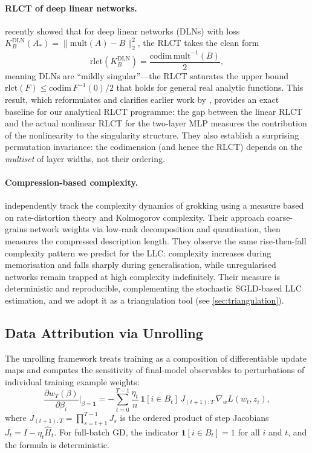 \documentclass[11pt,a4paper]{article}
\begin{document}
\paragraph{RLCT of deep linear networks.} \citet{pepinlehalleur2025geometry} recently showed that for deep linear networks (DLNs) with loss $K^{\mathrm{DLN}}_B(A_*) = \|\mathrm{mult}(A) - B\|_2^2$, the RLCT takes the clean form
\begin{equation}
    \mathrm{rlct}(K^{\mathrm{DLN}}_B) = \frac{\mathrm{codim}\,\mathrm{mult}^{-1}(B)}{2},
\end{equation}
meaning DLNs are ``mildly singular''---the RLCT saturates the upper bound $\mathrm{rlct}(F) \leq \mathrm{codim}\,F^{-1}(0)/2$ that holds for general real analytic functions. This result, which reformulates and clarifies earlier work by \citet{aoyagi2024consideration}, provides an exact baseline for our analytical RLCT programme: the gap between the linear RLCT and the actual nonlinear RLCT for the two-layer MLP measures the contribution of the nonlinearity to the singularity structure. They also establish a surprising permutation invariance: the codimension (and hence the RLCT) depends on the \emph{multiset} of layer widths, not their ordering.

\paragraph{Compression-based complexity.} \citet{demoss2025complexity} independently track the complexity dynamics of grokking using a measure based on rate-distortion theory and Kolmogorov complexity. Their approach coarse-grains network weights via low-rank decomposition and quantisation, then measures the compressed description length. They observe the same rise-then-fall complexity pattern we predict for the LLC: complexity increases during memorisation and falls sharply during generalisation, while unregularised networks remain trapped at high complexity indefinitely. Their measure is deterministic and reproducible, complementing the stochastic SGLD-based LLC estimation, and we adopt it as a triangulation tool (see \cref{sec:triangulation}).

\subsection{Data Attribution via Unrolling}

The unrolling framework \citep{bae2024source, jaburi2026data} treats training as a composition of differentiable update maps and computes the sensitivity of final-model observables to perturbations of individual training example weights:
\begin{equation}\label{eq:unrolling}
    \frac{\partial w_T(\beta)}{\partial \beta_i}\bigg|_{\beta=\mathbf{1}} = -\sum_{t=0}^{T-1} \frac{\eta_t}{n}\, \mathbf{1}[i \in B_t]\, J_{(t+1):T}\, \nabla_w L(w_t, z_i),
\end{equation}
where $J_{(t+1):T} = \prod_{s=t+1}^{T-1} J_s$ is the ordered product of step Jacobians $J_t = I - \eta_t \hat{H}_t$. For full-batch GD, the indicator $\mathbf{1}[i \in B_t] = 1$ for all $i$ and $t$, and the formula is deterministic.
\end{document}
